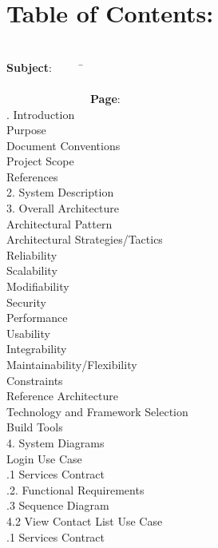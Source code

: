 \documentclass[29pt,a4paper]{moderncv}
\begin{document}
\section{\textbf{Table of Contents:}}
\begin{tabbing}
\\\textbf{Subject}: ~~~~~\= ~~~~~~~~~~~~~~~~~~~~~~~~~~~~~~~~~~~~~~~~~~~~~~~~~~~~~~~~~~~~~~~~~~~~~~~~~~~~~~~~~~~~~~~\= \textbf{Page}:
\\. Introduction \> \\							
 Purpose 	\\							
 Document Conventions 					\\
 Project Scope 							\\
 References 							\\
2. System Description \> 					\\
3. Overall Architecture \> 				\\
 Architectural Pattern  				\\
 Architectural Strategies/Tactics  	\\
\> Reliability 							\\
\> Scalability 							\\
\> Modifiability 							\\
\> Security						\\
\> Performance 						\\
\> Usability 							\\
\> Integrability 						\\
\> Maintainability/Flexibility 		\\
\> Constraints 						\\
 Reference Architecture 			\\
 Technology and Framework Selection  		\\
 Build Tools 							\\
4. System Diagrams \> \\
 Login Use Case \\
.1 Services Contract \\
.2. Functional Requirements \\
.3 Sequence Diagram \\
4.2 View Contact List Use Case \> \\
.1 Services Contract \\

\end{tabbing}
\end{document}
